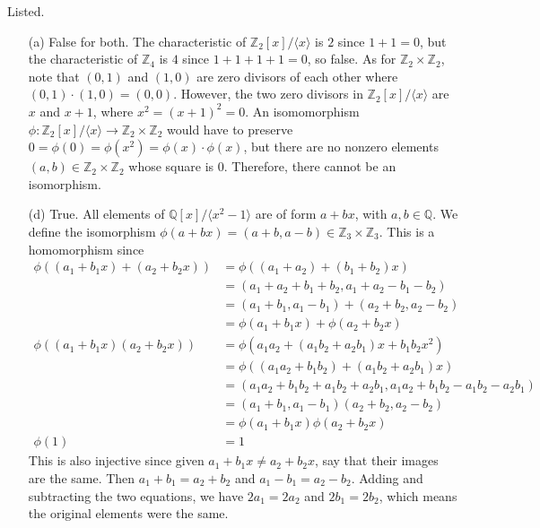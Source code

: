   \begin{solution}
    Listed. 
    \begin{enumerate}
      \item[(a)] False for both. The characteristic of $\mathbb{Z}_2 [x]/ \langle x \rangle$ is $2$ since $1 + 1 = 0$, but the characteristic of $\mathbb{Z}_4$ is $4$ since $1 + 1 + 1 + 1 = 0$, so false. As for $\mathbb{Z}_2 \times \mathbb{Z}_2$, note that $(0, 1)$ and $(1, 0)$ are zero divisors of each other where $(0, 1) \cdot (1, 0) = (0, 0)$. However, the two zero divisors in $\mathbb{Z}_2 [x]/ \langle x \rangle$ are $x$ and $x+1$, where $x^2 = (x+1)^2 = 0$. An isomomorphism $\phi: \mathbb{Z}_2 [x]/ \langle x \rangle \rightarrow \mathbb{Z}_2 \times \mathbb{Z}_2$ would have to preserve $0 = \phi(0) = \phi(x^2) = \phi(x) \cdot \phi(x)$, but there are no nonzero elements $(a, b) \in \mathbb{Z}_2 \times \mathbb{Z}_2$ whose square is $0$. Therefore, there cannot be an isomorphism. 

      \item[(d)] True. All elements of $\mathbb{Q}[x] /\langle x^2 - 1\rangle$ are of form $a + bx$, with $a, b \in \mathbb{Q}$. We define the isomorphism $\phi(a + bx) = (a + b, a - b) \in \mathbb{Z}_3 \times \mathbb{Z}_3$. This is a homomorphism since 
      \begin{align}
        \phi((a_1 + b_1 x) + (a_2 + b_2 x)) & = \phi((a_1 + a_2) + (b_1 + b_2) x) \\
                                            & = (a_1 + a_2 + b_1 + b_2, a_1 + a_2 - b_1 - b_2) \\
                                            & = (a_1 + b_1, a_1 - b_1) + (a_2 + b_2, a_2 - b_2) \\
                                            & = \phi(a_1 + b_1 x) + \phi(a_2 + b_2 x) \\
        \phi((a_1 + b_1 x)(a_2 + b_2 x)) & = \phi(a_1 a_2 + (a_1 b_2 + a_2 b_1) x + b_1 b_2 x^2) \\
                                         & = \phi((a_1 a_2 + b_1 b_2) + (a_1 b_2 + a_2 b_1) x )\\
                                         & = (a_1 a_2 + b_1 b_2 + a_1 b_2 + a_2 b_1, a_1 a_2 + b_1 b_2 - a_1 b_2 - a_2 b_1) \\ 
                                         & = (a_1 + b_1, a_1 - b_1) (a_2 + b_2, a_2 - b_2) \\
                                         & = \phi(a_1 + b_1 x) \phi(a_2 + b_2 x) \\
        \phi(1) & = 1
      \end{align}
      This is also injective since given $a_1 + b_1 x \neq a_2 + b_2 x$, say that their images are the same. Then $a_1 + b_1 = a_2 + b_2$ and $a_1 - b_1 = a_2 - b_2$. Adding and subtracting the two equations, we have $2a_1 = 2a_2$ and $2b_1 = 2b_2$, which means the original elements were the same. 
    \end{enumerate}
  \end{solution}

